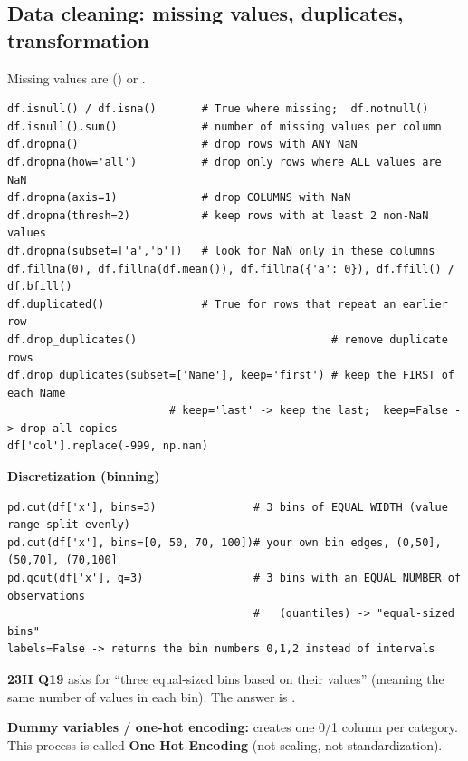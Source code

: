 \subsection{Data cleaning: missing values, duplicates, transformation}
Missing values are  () or .
\begin{codebox}
\begin{Verbatim}
df.isnull() / df.isna()       # True where missing;  df.notnull()
df.isnull().sum()             # number of missing values per column
df.dropna()                   # drop rows with ANY NaN
df.dropna(how='all')          # drop only rows where ALL values are NaN
df.dropna(axis=1)             # drop COLUMNS with NaN
df.dropna(thresh=2)           # keep rows with at least 2 non-NaN values
df.dropna(subset=['a','b'])   # look for NaN only in these columns
df.fillna(0), df.fillna(df.mean()), df.fillna({'a': 0}), df.ffill() / df.bfill()
df.duplicated()               # True for rows that repeat an earlier row
df.drop_duplicates()                              # remove duplicate rows
df.drop_duplicates(subset=['Name'], keep='first') # keep the FIRST of each Name
                         # keep='last' -> keep the last;  keep=False -> drop all copies
df['col'].replace(-999, np.nan)
\end{Verbatim}
\end{codebox}

\textbf{Discretization (binning)}
\begin{codebox}
\begin{Verbatim}
pd.cut(df['x'], bins=3)               # 3 bins of EQUAL WIDTH (value range split evenly)
pd.cut(df['x'], bins=[0, 50, 70, 100])# your own bin edges, (0,50], (50,70], (70,100]
pd.qcut(df['x'], q=3)                 # 3 bins with an EQUAL NUMBER of observations
                                      #   (quantiles) -> "equal-sized bins"
labels=False -> returns the bin numbers 0,1,2 instead of intervals
\end{Verbatim}
\end{codebox}
\textbf{23H Q19} asks for ``three equal-sized bins based on their values'' (meaning the same number of values in each bin). The answer is .

\textbf{Dummy variables / one-hot encoding:}  creates one 0/1 column per category. This process is called \textbf{One Hot Encoding} (not scaling, not standardization).

